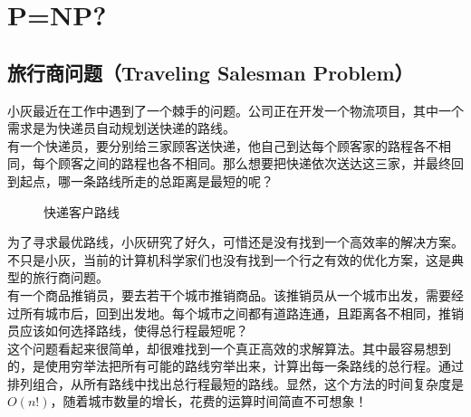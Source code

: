 \newpage

\section{P=NP?}

\subsection{旅行商问题（Traveling Salesman Problem）}

小灰最近在工作中遇到了一个棘手的问题。公司正在开发一个物流项目，其中一个需求是为快递员自动规划送快递的路线。\\

有一个快递员，要分别给三家顾客送快递，他自己到达每个顾客家的路程各不相同，每个顾客之间的路程也各不相同。那么想要把快递依次送达这三家，并最终回到起点，哪一条路线所走的总距离是最短的呢？

\begin{figure}[H]
	\centering
	\caption{快递客户路线}
\end{figure}

为了寻求最优路线，小灰研究了好久，可惜还是没有找到一个高效率的解决方案。不只是小灰，当前的计算机科学家们也没有找到一个行之有效的优化方案，这是典型的旅行商问题。\\

有一个商品推销员，要去若干个城市推销商品。该推销员从一个城市出发，需要经过所有城市后，回到出发地。每个城市之间都有道路连通，且距离各不相同，推销员应该如何选择路线，使得总行程最短呢？\\

这个问题看起来很简单，却很难找到一个真正高效的求解算法。其中最容易想到的，是使用穷举法把所有可能的路线穷举出来，计算出每一条路线的总行程。通过排列组合，从所有路线中找出总行程最短的路线。显然，这个方法的时间复杂度是$ O(n!) $，随着城市数量的增长，花费的运算时间简直不可想象！\\


